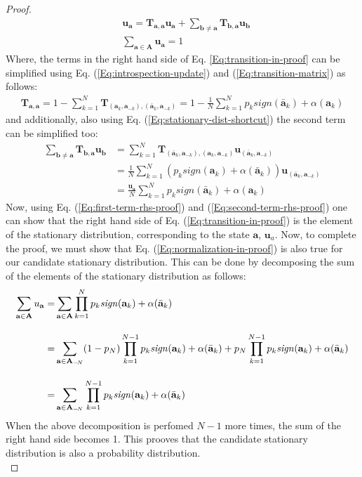 \documentclass[11pt]{article}
\theoremstyle{plainCl1}
\theoremstyle{plainCl2}
\newcommand{\A}{\mathbf{A}}
\newcommand{\abf}{\mathbf{a}}
\newcommand{\bbf}{\mathbf{b}}
\newcommand{\T}{\mathbf{T}}
\newcommand{\ubf}{\mathbf{u}}
\begin{document}
\begin{proof}
\begin{align}
\label{Eq:transition-in-proof}
&\ubf_\abf = \T_{\abf,\abf} \ubf_\abf  + \sum_{\bbf \neq \abf} \T_{\bbf, \abf} \ubf_{\bbf}  \\[10pt] 
\label{Eq:normalization-in-proof}
&\sum_{\abf \in \A} \ubf_{\abf}= 1
\end{align}
Where, the terms in the right hand side of Eq. \ref{Eq:transition-in-proof} can be simplified using Eq. (\ref{Eq:introspection-update}) and (\ref{Eq:transition-matrix}) as follows:
\begin{eqnarray}
\T_{\abf,\abf} = 1 - \sum_{k=1}^{N} \T_{(\abf_k, \abf_{-k}), (\bar{\abf}_k,\abf_{-k})} = 1 - \frac{1}{N} \sum_{k=1}^{N} p_k \textit{sign}(\bar{\abf}_k) + \alpha(\abf_k)
\label{Eq:first-term-rhs-proof}
\end{eqnarray} 
and additionally, also using Eq. (\ref{Eq:stationary-dist-shortcut}) the second term can be simplified too:
\begin{align}
\sum_{\bbf \neq \abf} \T_{\bbf, \abf} \ubf_{\bbf} &= \sum_{k = 1}^N \T_{(\bar{\abf}_k,\abf_{-k}), (\abf_k, \abf_{-k})} \ubf_{(\bar{\abf}_k,\abf_{-k})} \\[10pt]
&= \frac{1}{N} \sum_{k = 1}^N \left(p_k \textit{sign}(\abf_k) +\alpha(\bar{\abf}_k) \right) \ubf_{(\bar{\abf}_k,\abf_{-k})} \\[10pt] 
\label{Eq:second-term-rhs-proof}
&= \frac{\ubf_\abf}{N} \sum_{k=1}^{N} p_k \textit{sign}(\bar{\abf}_k) + \alpha(\abf_k) 
\end{align}
Now, using Eq. (\ref{Eq:first-term-rhs-proof}) and (\ref{Eq:second-term-rhs-proof}) one can show that the right hand side of Eq. (\ref{Eq:transition-in-proof}) is the element of the stationary distribution, corresponding to the state $\abf$, $\ubf_a$.  Now, to complete the proof, we must show that Eq. (\ref{Eq:normalization-in-proof}) is also true for our candidate stationary distribution. This can be done by decomposing the sum of the elements of the stationary distribution as follows:
\begin{align}
\sum_{\abf \in \A} u_{\abf} =& \displaystyle \sum_{\abf \in \A} \prod_{k=1}^N p_k \mathit{sign}(\abf_k) + \alpha(\bar{\abf}_k) \\[10pt]
=& \displaystyle \displaystyle \sum_{\abf \in \A_{-\!N}} (1-p_N)  \prod_{k=1}^{N-1} p_k \mathit{sign}(\abf_k) + \alpha(\bar{\abf}_k)  + p_N  \prod_{k=1}^{N-1} p_k \mathit{sign}(\abf_k) + \alpha(\bar{\abf}_k) \\[10pt]
=& \displaystyle \sum_{\abf \in \A_{-\!N}} \prod_{k=1}^{N-1} p_k \mathit{sign}(\abf_k) + \alpha(\bar{\abf}_k)
\end{align}
When the above decomposition is perfomed $N-1$ more times, the sum of the right hand side becomes 1. This prooves that the candidate stationary distribution is also a probability distribution.\\
\end{proof}
\end{document}
